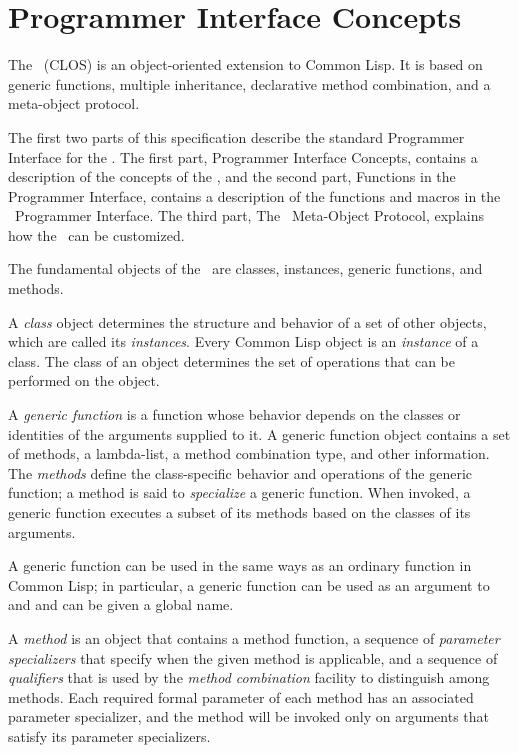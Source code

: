 \section{Programmer Interface Concepts}

The \CLOS\ (CLOS) is an object-oriented extension to Common Lisp. It is based on
generic functions, multiple inheritance, declarative method
combination, and a meta-object protocol.

The first two parts of this specification describe
the standard Programmer Interface for the \CLOS.  The first part,
Programmer Interface Concepts,
contains a description of the concepts of the \CLOS, and the second part,
Functions in the Programmer Interface,
contains a description of the functions and macros in the \CLOS\
Programmer Interface.  The third part, The \CLOS\ Meta-Object
Protocol, explains how the \CLOS\ can be customized.

The fundamental objects of the \CLOS\ are classes, instances,
generic functions, and methods. 

A \emph{class} object determines the structure and behavior of a set
of other objects, which are called its \emph{instances}. 
Every Common Lisp object is an \emph{instance} of a class.  The class of an
object determines the set of operations that can be performed on the object. 

A \emph{generic function} is a function whose behavior depends on the
classes or identities of the arguments supplied to it.  A generic
function object contains a set of methods, a lambda-list, a
method combination type, and other information.  The \emph{methods} define
the class-specific behavior and operations of the generic function; a
method is said to \emph{specialize} a generic function.  When invoked,
a generic function executes a subset of its methods based on the
classes of its arguments.

A generic function can be used in 
the same ways as an ordinary function in Common Lisp; in
particular, a generic function can be used as an argument to 
 and  and can be given a global name.%

A \emph{method} is an object that contains a method function, a sequence of
\emph{parameter specializers} that specify when the given method is
applicable, and a sequence of \emph{qualifiers} that is used by the
\emph{method combination} facility to distinguish among methods.  Each
required formal parameter of each method has an associated parameter
specializer, and the method will be invoked only on arguments that
satisfy its parameter specializers.

